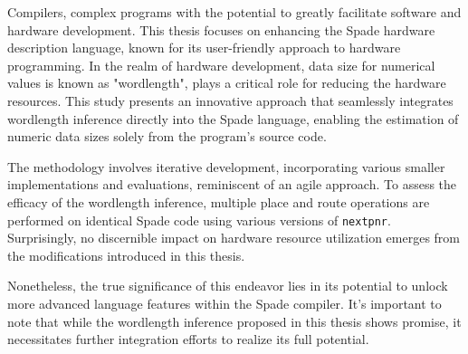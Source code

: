 Compilers, complex programs with the potential to greatly facilitate software and hardware development. This thesis focuses on enhancing the Spade hardware description language, known for its user-friendly approach to hardware programming. In the realm of hardware development, data size for numerical values is known as "wordlength", plays a critical role for reducing the hardware resources. This study presents an innovative approach that seamlessly integrates wordlength inference directly into the Spade language, enabling the estimation of numeric data sizes solely from the program's source code.

The methodology involves iterative development, incorporating various smaller implementations and evaluations, reminiscent of an agile approach. To assess the efficacy of the wordlength inference, multiple place and route operations are performed on identical Spade code using various versions of \verb+nextpnr+. Surprisingly, no discernible impact on hardware resource utilization emerges from the modifications introduced in this thesis.

Nonetheless, the true significance of this endeavor lies in its potential to unlock more advanced language features within the Spade compiler. It's important to note that while the wordlength inference proposed in this thesis shows promise, it necessitates further integration efforts to realize its full potential.
